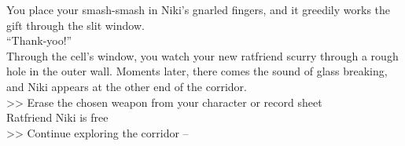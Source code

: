 You place your smash-smash in Niki’s gnarled fingers, and it greedily works the gift through the slit window.\\

“Thank-yoo!”\\

Through the cell’s window, you watch your new ratfriend scurry through a rough hole in the outer wall. Moments later, there comes the sound of glass breaking, and Niki appears at the other end of the corridor.\\

>> Erase the chosen weapon from your character or record sheet\\
 Ratfriend Niki is free\\
>> Continue exploring the corridor -- 